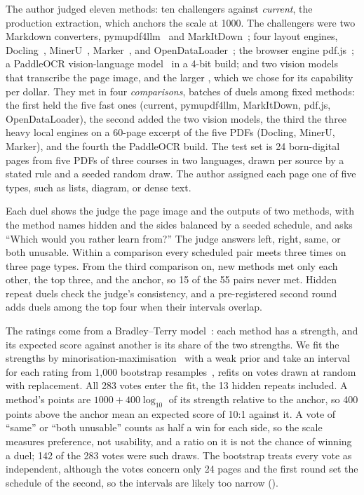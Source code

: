 The author judged eleven methods: ten challengers against \emph{current}, the
production extraction, which anchors the scale at 1000. The challengers were
two Markdown converters, pymupdf4llm~\cite{pymupdf4llm} and
MarkItDown~\cite{markitdown}; four layout engines,
Docling~\cite{auer2024docling}, MinerU~\cite{wang2024mineru},
Marker~\cite{marker}, and OpenDataLoader~\cite{opendataloader}; the browser
engine pdf.js~\cite{pdfjs}; a PaddleOCR vision-language
model~\cite{paddleocr} in a 4-bit build; and two vision models that
transcribe the page image,  and the larger
, which we chose for its capability per dollar. They met in
four \emph{comparisons}, batches of duels among fixed methods: the first held
the five fast ones (current, pymupdf4llm, MarkItDown, pdf.js,
OpenDataLoader), the second added the two vision models, the third the three
heavy local engines on a 60-page excerpt of the five PDFs (Docling, MinerU,
Marker), and the fourth the PaddleOCR build. The test set is 24
born-digital pages from five PDFs of three courses in two languages, drawn per
source by a stated rule and a seeded random draw. The author assigned each
page one of five types, such as lists, diagram, or dense text.

Each duel shows the judge the page image and the outputs of two methods, with
the method names hidden and the sides balanced by a seeded schedule, and asks
``Which would you rather learn from?'' The judge answers left, right, same, or
both unusable. Within a comparison every scheduled pair meets three times on
three page types. From the third comparison on, new methods met only each other, the top
three, and the anchor, so 15 of the 55 pairs never met. Hidden repeat duels
check the judge's consistency, and a pre-registered second round adds duels
among the top four when their intervals overlap.

The ratings come from a Bradley--Terry model~\cite{bradley1952rank}: each
method has a strength, and its expected score against another is its share of
the two strengths. We fit the strengths by
minorisation-maximisation~\cite{hunter2004mm} with a weak prior and take an
interval for each rating from 1{,}000 bootstrap
resamples~\cite{efron1993bootstrap}, refits on votes drawn at random with
replacement.
All 283 votes enter the fit, the 13 hidden repeats included. A method's points
are $1000 + 400 \log_{10}$ of its
strength relative to the anchor, so 400 points above the anchor mean an
expected score of 10:1 against it. A vote of ``same'' or ``both unusable''
counts as half a win for each side, so the scale measures preference, not
usability, and a ratio on it is not the chance of winning a duel; 142 of the
283 votes were such draws. The bootstrap treats every vote as independent,
although the votes concern only 24 pages and the first round set the schedule
of the second, so the intervals are likely too narrow
().

